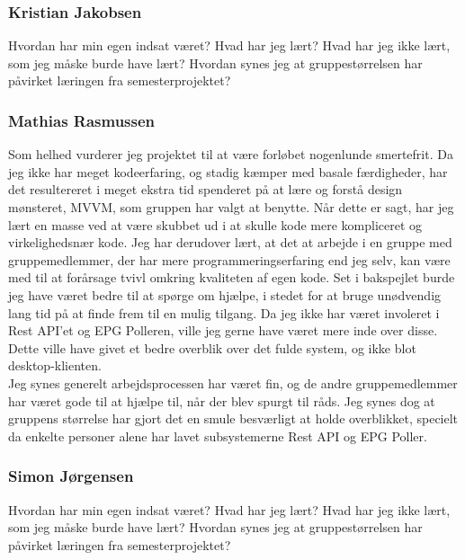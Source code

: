 \subsubsection{Kristian Jakobsen}
Hvordan har min egen indsat været?
Hvad har jeg lært?
Hvad har jeg ikke lært, som jeg måske burde have lært?
Hvordan synes jeg at gruppestørrelsen har påvirket læringen fra semesterprojektet?

\subsubsection{Mathias Rasmussen}
Som helhed vurderer jeg projektet til at være forløbet nogenlunde smertefrit. Da jeg ikke har meget kodeerfaring, og stadig kæmper med basale færdigheder, har det resultereret i meget ekstra tid spenderet på at lære og forstå design mønsteret, MVVM, som gruppen har valgt at benytte. Når dette er sagt, har jeg lært en masse ved at være skubbet ud i at skulle kode mere kompliceret og virkelighedsnær kode. Jeg har derudover lært, at det at arbejde i en gruppe med gruppemedlemmer, der har mere programmeringserfaring end jeg selv, kan være med til at forårsage tvivl omkring kvaliteten af egen kode. Set i bakspejlet burde jeg have været bedre til at spørge om hjælpe, i stedet for at bruge unødvendig lang tid på at finde frem til en mulig tilgang. 
Da jeg ikke har været involeret i Rest API'et og EPG Polleren, ville jeg gerne have været mere inde over disse. Dette ville have givet et bedre overblik over det fulde system, og ikke blot desktop-klienten.\\
Jeg synes generelt arbejdsprocessen har været fin, og de andre gruppemedlemmer har været gode til at hjælpe til, når der blev spurgt til råds. Jeg synes dog at gruppens størrelse har gjort det en smule besværligt at holde overblikket, specielt da enkelte personer alene har lavet subsystemerne Rest API og EPG Poller. 


\subsubsection{Simon Jørgensen}
Hvordan har min egen indsat været?
Hvad har jeg lært?
Hvad har jeg ikke lært, som jeg måske burde have lært?
Hvordan synes jeg at gruppestørrelsen har påvirket læringen fra semesterprojektet?
